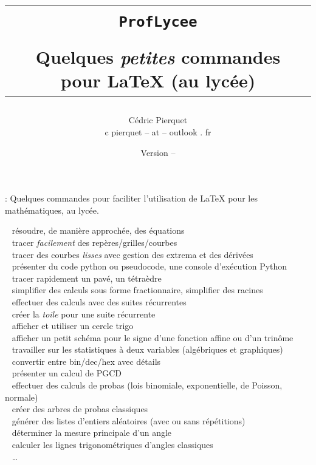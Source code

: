 \documentclass[a4paper,french,11pt]{article}
\title{%
\begin{minipage}{0.85\linewidth}
	\begin{tcolorbox}[colframe=yellow,colback=yellow!15]
		\begin{center}
			\begin{tabular}{c}
				\lstinline!ProfLycee!\\
				\\
				Quelques \textit{petites} commandes pour  \LaTeX{} (au lycée)
			\end{tabular}
		\end{center}
	\end{tcolorbox}
\end{minipage}
}
\author{
	\begin{tabular}{c}
		Cédric Pierquet\\
		{\ttfamily c pierquet -- at -- outlook . fr}
	\end{tabular}
}
\date{Version \PLversion{} -- \PLdate}
\newcommand\deblst{{\tiny\faCode}~}
\begin{document}
\setlength{\aweboxleftmargin}{0.07\linewidth}
\setlength{\aweboxcontentwidth}{0.93\linewidth}
\setlength{\aweboxvskip}{8pt}

\pagestyle{fancy}

\maketitle

\thispagestyle{empty}

{ : Quelques commandes pour faciliter l'utilisation de \LaTeX{} pour les mathématiques, au lycée.}

\medskip

{\small\noindent%
{\deblst} résoudre, de manière approchée, des équations\\
{\deblst} tracer \textit{facilement} des repères/grilles/courbes\\
{\deblst} tracer  des courbes \textit{lisses} avec gestion des extrema et des dérivées\\
{\deblst} présenter du code \textsf{python} ou \textsf{pseudocode}, une console d'exécution \textsf{Python} \\
{\deblst} tracer rapidement un pavé, un tétraèdre \\
{\deblst} simplifier des calculs sous forme fractionnaire, simplifier des racines \\
{\deblst} effectuer des calculs avec des suites récurrentes \\
{\deblst} créer la \textit{toile} pour une suite récurrente \\
{\deblst} afficher et utiliser un cercle trigo \\
{\deblst} afficher un petit schéma pour le signe d'une fonction affine ou d'un trinôme \\
{\deblst} travailler sur les statistiques à deux variables (algébriques et graphiques) \\
{\deblst} convertir entre bin/dec/hex avec détails \\
{\deblst} présenter un calcul de PGCD \\
{\deblst} effectuer des calculs de probas (lois binomiale, exponentielle, de Poisson, normale) \\
{\deblst} créer des arbres de probas \og classiques \fg \\
{\deblst} générer des listes d'entiers aléatoires (avec ou sans répétitions)\\
{\deblst} déterminer la mesure principale d'un angle \\
{\deblst} calculer les lignes trigonométriques d'angles \og classiques \fg{} \\
{\deblst} \ldots}
\end{document}
